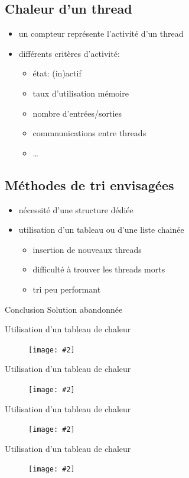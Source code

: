 \documentclass[mathserif]{beamer}
\newcommand{\myfig}[2] {
  \begin{figure}[!h]
    \centering
    \texttt{[image: \#2]}
  \end{figure}
}
\newcommand{\bframe}{\begin{frame}{\secname}{\subsecname}}
\begin{document}
    \subsection{Chaleur d'un thread}
      \bframe
        \begin{itemize}
          \item un compteur représente l'activité d'un thread
          \item différents critères d'activité:
            \begin{itemize}
              \item état: (in)actif
              \item taux d'utilisation mémoire
              \item nombre d'entrées/sorties
              \item commnunications entre threads
              \item \ldots
            \end{itemize}
        \end{itemize}
      \end{frame}

    \subsection{Méthodes de tri envisagées}
      \bframe
        \begin{itemize}
          \item nécessité d'une structure dédiée
          \item utilisation d'un tableau ou d'une liste chainée
          \begin{itemize}
            \item insertion de nouveaux threads
            \item difficulté à trouver les threads morts
            \item tri peu performant
          \end{itemize}
        \end{itemize}
         {
          \begin{alertblock}{Conclusion}
            Solution abandonnée
          \end{alertblock}
        }
      \end{frame}

      \bframe
          Utilisation d'un tableau de chaleur
          \myfig{0.25}{img/screen1.png}
      \end{frame}
      \bframe
          Utilisation d'un tableau de chaleur
          \myfig{0.25}{img/screen2.png}
      \end{frame}
      \bframe
          Utilisation d'un tableau de chaleur
          \myfig{0.25}{img/screen3.png}
      \end{frame}
      \bframe
          Utilisation d'un tableau de chaleur
          \myfig{0.25}{img/screen4.png}
      \end{frame}
\end{document}
